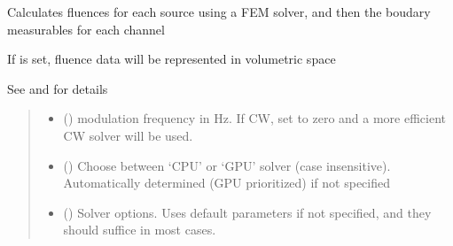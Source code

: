 \documentclass[letterpaper,10pt,english]{sphinxmanual}
\begin{document}
\begin{fulllineitems}
\begin{fulllineitems}
\label{\detokenize{_autosummary/nirfasterff.base.fluor_mesh.fluormesh:nirfasterff.base.fluor_mesh.fluormesh.femdata}}
\pysigstartsignatures
{}
\pysigstopsignatures
\sphinxAtStartPar
Calculates fluences for each source using a FEM solver, and then the boudary measurables for each channel

\sphinxAtStartPar
If  is set, fluence data will be represented in volumetric space

\sphinxAtStartPar
See {\hyperref[\detokenize{_autosummary/nirfasterff.forward.femdata.femdata_fl_CW:nirfasterff.forward.femdata.femdata_fl_CW}]{}} and {\hyperref[\detokenize{_autosummary/nirfasterff.forward.femdata.femdata_fl_FD:nirfasterff.forward.femdata.femdata_fl_FD}]{}} for details
\begin{quote}\begin{description}
\begin{itemize}
\item {} 
\sphinxAtStartPar
{} () \textendash{} modulation frequency in Hz. If CW, set to zero and a more efficient CW solver will be used.

\item {} 
\sphinxAtStartPar
{} (\sphinxstyleliteralemphasis{\sphinxupquote{, }}) \textendash{} Choose between ‘CPU’ or ‘GPU’ solver (case insensitive). Automatically determined (GPU prioritized) if not specified

\item {} 
\sphinxAtStartPar
{} ({\hyperref[\detokenize{_autosummary/nirfasterff.utils.SolverOptions:nirfasterff.utils.SolverOptions}]{}}\sphinxstyleliteralemphasis{\sphinxupquote{, }}) \textendash{} 
\sphinxAtStartPar
Solver options. Uses default parameters if not specified, and they should suffice in most cases.


\end{itemize}
\end{description}
\end{quote}
\end{fulllineitems}
\end{fulllineitems}
\end{document}
